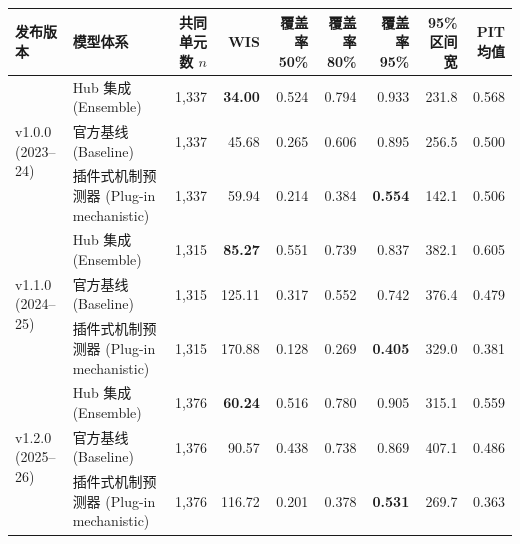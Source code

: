 \begin{tabular}{llrrrrrrr}
\toprule
发布版本 & 模型体系 & 共同单元数 $n$ & WIS & 覆盖率 50\% & 覆盖率 80\% & 覆盖率 95\% & 95\% 区间宽 & PIT 均值 \\
\midrule
\multirow{3}{*}{v1.0.0 (2023--24)}
& Hub 集成 (Ensemble) & 1,337 & \textbf{34.00} & 0.524 & 0.794 & 0.933 & 231.8 & 0.568 \\
& 官方基线 (Baseline) & 1,337 & 45.68 & 0.265 & 0.606 & 0.895 & 256.5 & 0.500 \\
& 插件式机制预测器 (Plug-in mechanistic) & 1,337 & 59.94 & 0.214 & 0.384 & \textbf{0.554} & 142.1 & 0.506 \\
\midrule
\multirow{3}{*}{v1.1.0 (2024--25)}
& Hub 集成 (Ensemble) & 1,315 & \textbf{85.27} & 0.551 & 0.739 & 0.837 & 382.1 & 0.605 \\
& 官方基线 (Baseline) & 1,315 & 125.11 & 0.317 & 0.552 & 0.742 & 376.4 & 0.479 \\
& 插件式机制预测器 (Plug-in mechanistic) & 1,315 & 170.88 & 0.128 & 0.269 & \textbf{0.405} & 329.0 & 0.381 \\
\midrule
\multirow{3}{*}{v1.2.0 (2025--26)}
& Hub 集成 (Ensemble) & 1,376 & \textbf{60.24} & 0.516 & 0.780 & 0.905 & 315.1 & 0.559 \\
& 官方基线 (Baseline) & 1,376 & 90.57 & 0.438 & 0.738 & 0.869 & 407.1 & 0.486 \\
& 插件式机制预测器 (Plug-in mechanistic) & 1,376 & 116.72 & 0.201 & 0.378 & \textbf{0.531} & 269.7 & 0.363 \\
\bottomrule
\end{tabular}

